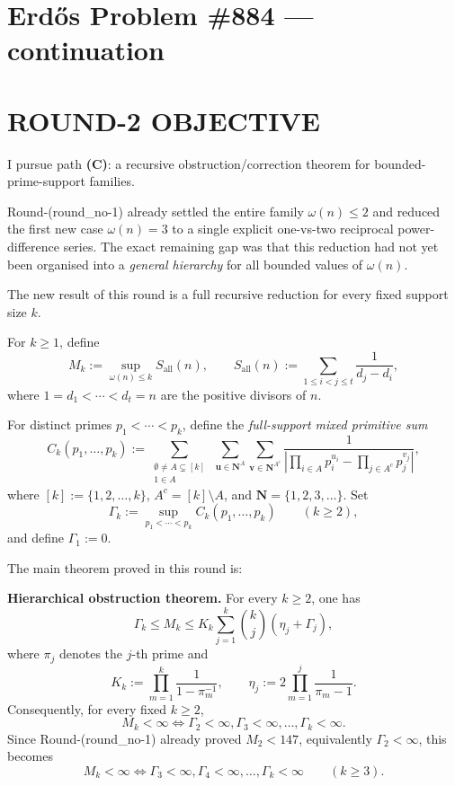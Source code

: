 \section{Erd\H{o}s Problem \#884 --- continuation}

\section{ROUND-2 OBJECTIVE}

I pursue path \textbf{(C)}: a recursive obstruction/correction theorem for bounded-prime-support families.

Round-(round\_no-1) already settled the entire family \(\omega(n)\le 2\) and reduced the first new case \(\omega(n)=3\) to a single explicit one-vs-two reciprocal power-difference series. The exact remaining gap was that this reduction had not yet been organised into a \emph{general hierarchy} for all bounded values of \(\omega(n)\).

The new result of this round is a full recursive reduction for every fixed support size \(k\).

\medskip

For \(k\ge 1\), define
\[
M_k:=\sup_{\omega(n)\le k} S_{\mathrm{all}}(n),
\qquad
S_{\mathrm{all}}(n):=\sum_{1\le i<j\le t}\frac{1}{d_j-d_i},
\]
where \(1=d_1<\cdots<d_t=n\) are the positive divisors of \(n\).

For distinct primes \(p_1<\cdots<p_k\), define the \emph{full-support mixed primitive sum}
\[
C_k(p_1,\dots,p_k)
:=
\sum_{\substack{\emptyset\neq A\subsetneq [k]\\ 1\in A}}
\ 
\sum_{\mathbf u\in \mathbf N^{A}}
\sum_{\mathbf v\in \mathbf N^{A^c}}
\frac{1}{\left|\prod_{i\in A}p_i^{u_i}-\prod_{j\in A^c}p_j^{v_j}\right|},
\]
where \([k]:=\{1,2,\dots,k\}\), \(A^c=[k]\setminus A\), and \(\mathbf N=\{1,2,3,\dots\}\).
Set
\[
\Gamma_k:=\sup_{p_1<\cdots<p_k} C_k(p_1,\dots,p_k)
\qquad (k\ge 2),
\]
and define \(\Gamma_1:=0\).

The main theorem proved in this round is:

\medskip

\noindent\textbf{Hierarchical obstruction theorem.}
For every \(k\ge 2\), one has
\[
\Gamma_k\le M_k\le K_k\sum_{j=1}^{k}\binom{k}{j}(\eta_j+\Gamma_j),
\]
where \(\pi_j\) denotes the \(j\)-th prime and
\[
K_k:=\prod_{m=1}^{k}\frac{1}{1-\pi_m^{-1}},
\qquad
\eta_j:=2\prod_{m=1}^{j}\frac{1}{\pi_m-1}.
\]
Consequently, for every fixed \(k\ge 2\),
\[
M_k<\infty
\iff
\Gamma_2<\infty,\Gamma_3<\infty,\dots,\Gamma_k<\infty.
\]
Since Round-(round\_no-1) already proved \(M_2<147\), equivalently \(\Gamma_2<\infty\), this becomes
\[
M_k<\infty
\iff
\Gamma_3<\infty,\Gamma_4<\infty,\dots,\Gamma_k<\infty
\qquad (k\ge 3).
\]

